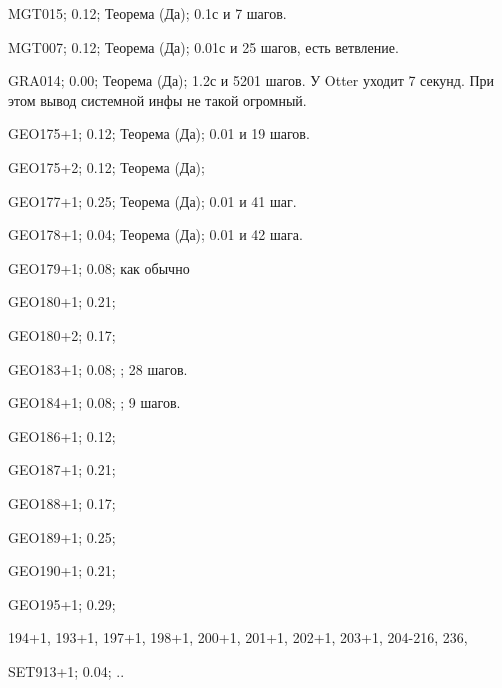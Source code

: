 MGT015; 0.12; Теорема (Да); 0.1с и 7 шагов.

MGT007; 0.12; Теорема (Да); 0.01с и 25 шагов, есть ветвление.

GRA014; 0.00; Теорема (Да); 1.2с и 5201 шагов. У Otter уходит 7 секунд. При этом вывод системной инфы не такой огромный.

GEO175+1; 0.12; Теорема (Да); 0.01 и 19 шагов.

GEO175+2; 0.12; Теорема (Да);

GEO177+1; 0.25; Теорема (Да); 0.01 и 41 шаг.

GEO178+1; 0.04; Теорема (Да); 0.01 и 42 шага.

GEO179+1; 0.08; как обычно

GEO180+1; 0.21;

GEO180+2; 0.17;

GEO183+1; 0.08; ; 28 шагов.

GEO184+1; 0.08; ; 9 шагов.

GEO186+1; 0.12;

GEO187+1; 0.21;

GEO188+1; 0.17;

GEO189+1; 0.25;

GEO190+1; 0.21;

GEO195+1; 0.29;

194+1, 193+1, 197+1, 198+1, 200+1, 201+1, 202+1, 203+1, 204-216, 236,   

SET913+1; 0.04; ..







